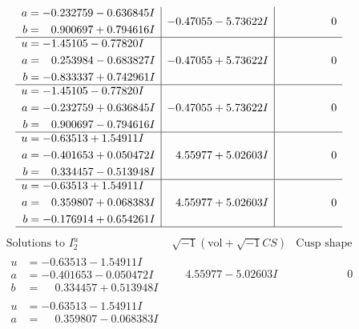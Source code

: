 \documentclass[1p]{elsarticle_modified}
\theoremstyle{definition}
\newcommand{\I}{\sqrt{-1}}
\begin{document}
$$\begin{array}{c|c|c}
\begin{aligned}
a &= -0.232759 - 0.636845 I \\
b &= \phantom{-}0.900697 + 0.794616 I\end{aligned}
 & -0.47055 - 5.73622 I & \phantom{-0.000000 } 0 \\ \hline\begin{aligned}
u &= -1.45105 - 0.77820 I \\
a &= \phantom{-}0.253984 - 0.683827 I \\
b &= -0.833337 + 0.742961 I\end{aligned}
 & -0.47055 + 5.73622 I & \phantom{-0.000000 } 0 \\ \hline\begin{aligned}
u &= -1.45105 - 0.77820 I \\
a &= -0.232759 + 0.636845 I \\
b &= \phantom{-}0.900697 - 0.794616 I\end{aligned}
 & -0.47055 + 5.73622 I & \phantom{-0.000000 } 0 \\ \hline\begin{aligned}
u &= -0.63513 + 1.54911 I \\
a &= -0.401653 + 0.050472 I \\
b &= \phantom{-}0.334457 - 0.513948 I\end{aligned}
 & \phantom{-}4.55977 + 5.02603 I & \phantom{-0.000000 } 0 \\ \hline\begin{aligned}
u &= -0.63513 + 1.54911 I \\
a &= \phantom{-}0.359807 + 0.068383 I \\
b &= -0.176914 + 0.654261 I\end{aligned}
 & \phantom{-}4.55977 + 5.02603 I & \phantom{-0.000000 } 0\\
 \hline 
 \end{array}$$\newpage$$\begin{array}{c|c|c}  
\text{Solutions to }I^u_{2}& \I (\text{vol} + \sqrt{-1}CS) & \text{Cusp shape}\\
 \hline 
\begin{aligned}
u &= -0.63513 - 1.54911 I \\
a &= -0.401653 - 0.050472 I \\
b &= \phantom{-}0.334457 + 0.513948 I\end{aligned}
 & \phantom{-}4.55977 - 5.02603 I & \phantom{-0.000000 } 0 \\ \hline\begin{aligned}
u &= -0.63513 - 1.54911 I \\
a &= \phantom{-}0.359807 - 0.068383 I \\

\end{aligned}
\end{array}$$
\end{document}
